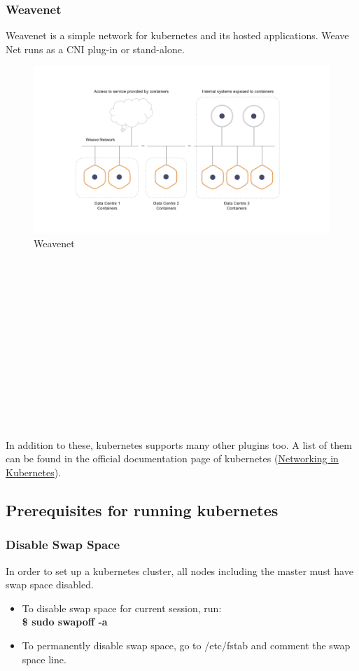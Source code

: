 \documentclass[12pt]{article}
\begin{document}
\subsubsection{Weavenet}
Weavenet is a simple network for kubernetes and its hosted applications. Weave Net runs as a CNI plug-in or stand-alone.
\begin{figure}[h!]
	\begin{center}
		\includegraphics[totalheight=0.33\textheight]{weavenet}
		\caption{Weavenet \cite{Weavenet}}
	\end{center}
\end{figure}
\\\\\\\\\\\\\\\\\\\\\\\\
\\In addition to these, kubernetes supports many other plugins too. A list of them can be found in the official documentation page of kubernetes (\href{https://kubernetes.io/docs/concepts/cluster-administration/networking/}{Networking in Kubernetes}).
\subsection{Prerequisites for running kubernetes \cite{Prereq}}
\subsubsection{Disable Swap Space}
In order to set up a kubernetes cluster, all nodes including the master must have swap space disabled.
\begin{itemize}
	\item To disable swap space for current session, run: \\
	\textbf{\$ sudo swapoff -a}
	\item To permanently disable swap space, go to /etc/fstab and comment the swap space line.
\end{itemize}
\end{document}
